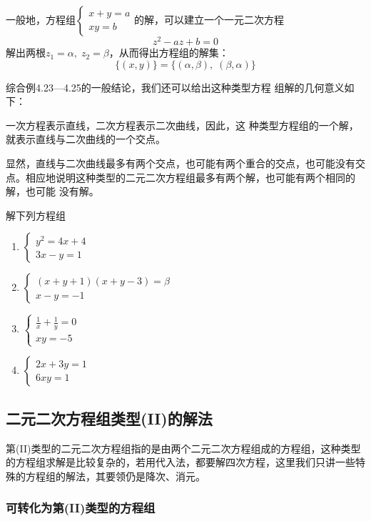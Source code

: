 一般地，方程组$\begin{cases}
x+y=a\\ xy=b
\end{cases}$的解，可以建立一个一元二次方程
\[z^2-az+b=0\]
解出两根$z_1=\alpha,\; z_2=\beta$，从而得出方程组的解集：
\[\{(x,y)\}=\{(\alpha,\beta ),\; (\beta ,\alpha)\}\]

综合例4.23---4.25的一般结论，我们还可以给出这种类型方程
组解的几何意义如下：

一次方程表示直线，二次方程表示二次曲线，因此，这
种类型方程组的一个解，就表示直线与二次曲线的一个交点。

显然，直线与二次曲线最多有两个交点，也可能有两个重合的交点，也可能没有交点。相应地说明这种类型的二元二次方程组最多有两个解，也可能有两个相同的解，也可能
没有解。

\begin{ex}
解下列方程组
\begin{multicols}{2}
\begin{enumerate}
\item $\begin{cases}
y^2=4x+4\\3x-y=1
\end{cases}$
\item $\begin{cases}
(x+y+1)(x+y-3)=\beta\\
x-y=-1
\end{cases}$
\item $\begin{cases}
\frac{1}{x}+\frac{1}{y}=0\\
xy=-5
\end{cases}$
\item $\begin{cases}
2x+3y=1\\ 6xy=1
\end{cases}$
\end{enumerate}
\end{multicols}
\end{ex}

\subsection{二元二次方程组类型(II)的解法}

第(II)类型的二元二次方程组指的是由两个二元二次方程组成的方程组，这种类型的方程组求解是比较复杂的，若用代入法，都要解四次方程，这里我们只讲一些特殊的方程组的解法，其要领仍是降次、消元。

\subsubsection{可转化为第(II)类型的方程组}

